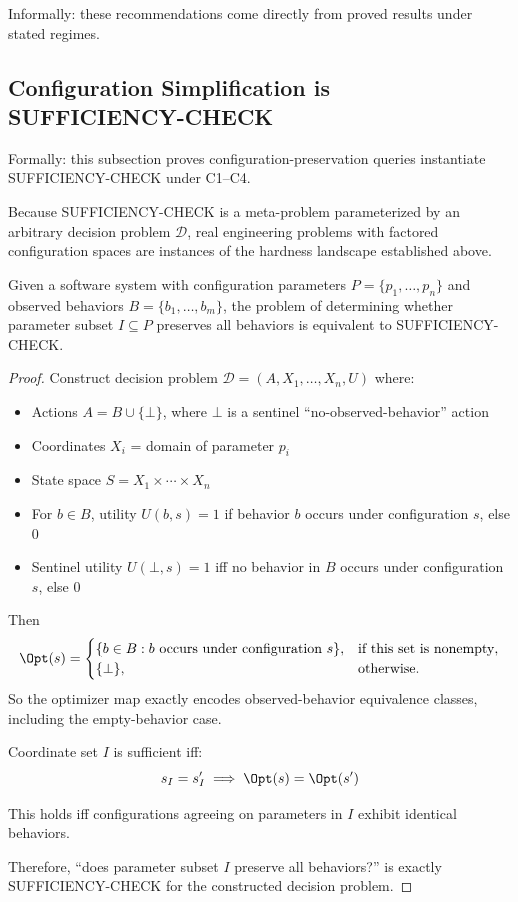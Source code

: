 Informally: these recommendations come directly from proved results under stated regimes.

\subsection{Configuration Simplification is SUFFICIENCY-CHECK}

Formally: this subsection proves configuration-preservation queries instantiate SUFFICIENCY-CHECK under C1--C4.

Because SUFFICIENCY-CHECK is a meta-problem parameterized by an arbitrary decision problem $\mathcal{D}$, real engineering problems with factored configuration spaces are instances of the hardness landscape established above.

\begin{theorem}
\label{thm:config-reduction}
Given a software system with configuration parameters $P = \{p_1, \ldots, p_n\}$ and observed behaviors $B = \{b_1, \ldots, b_m\}$, the problem of determining whether parameter subset $I \subseteq P$ preserves all behaviors is equivalent to SUFFICIENCY-CHECK.
\end{theorem}

\begin{proof}
Construct decision problem $\mathcal{D} = (A, X_1, \ldots, X_n, U)$ where:
\begin{itemize}
\item Actions $A = B \cup \{\bot\}$, where $\bot$ is a sentinel ``no-observed-behavior'' action
\item Coordinates $X_i$ = domain of parameter $p_i$
\item State space $S = X_1 \times \cdots \times X_n$
\item For $b\in B$, utility $U(b, s) = 1$ if behavior $b$ occurs under configuration $s$, else $0$
\item Sentinel utility $U(\bot,s)=1$ iff no behavior in $B$ occurs under configuration $s$, else $0$
\end{itemize}

Then
\[
\Opt(s)=
\begin{cases}
\{b \in B : b \text{ occurs under configuration } s\}, & \text{if this set is nonempty},\\
\{\bot\}, & \text{otherwise}.
\end{cases}
\]
So the optimizer map exactly encodes observed-behavior equivalence classes, including the empty-behavior case.

Coordinate set $I$ is sufficient iff:
\[
s_I = s'_I \implies \Opt(s) = \Opt(s')
\]

This holds iff configurations agreeing on parameters in $I$ exhibit identical behaviors.

Therefore, ``does parameter subset $I$ preserve all behaviors?'' is exactly SUFFICIENCY-CHECK for the constructed decision problem.
\end{proof}

